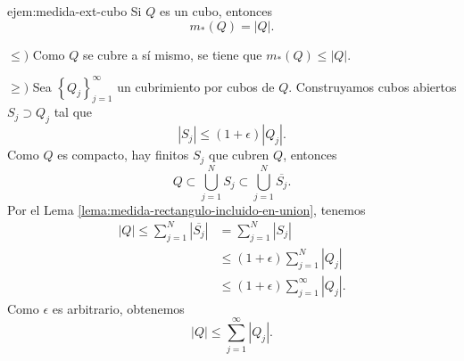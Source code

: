   \begin{ejemplo}{ejem:medida-ext-cubo}
  Si $Q$ es un cubo, entonces \[m_{*}(Q)=|Q|.\] 
  
  $\leq)$
  Como $Q$ se cubre a s\'i mismo, se tiene que $m_{*}(Q)\leq |Q|$.
  
  $\geq)$ 
  Sea $\left\{Q_j\right\}_{j=1}^{\infty}$ un cubrimiento por cubos de $Q$. Construyamos cubos abiertos $S_j \supset Q_j$ tal que 
  \[
  |S_j|\leq (1+\epsilon) |Q_j|.
  \]
  Como $Q$ es compacto, hay finitos $S_j$ que cubren $Q$, entonces
  \[
  Q\subset \bigcup\limits_{j=1}^N S_j \subset 
  \bigcup\limits_{j=1}^N \overline{S_j}.
  \]
  Por el Lema \ref{lema:medida-rectangulo-incluido-en-union}, tenemos
  \[
  \begin{split}
  |Q|\leq 
  \sum\limits_{j=1}^N |\overline{S_j}|&=
  \sum\limits_{j=1}^N |S_j|
  \\
  &\leq (1+\epsilon) \sum\limits_{j=1}^N |Q_j|\\
  &\leq   (1+\epsilon) \sum\limits_{j=1}^{\infty} |Q_j|.
  \end{split}
  \]
  Como $\epsilon$ es arbitrario, obtenemos
  \[
  |Q|\leq \sum\limits_{j=1}^{\infty} |Q_j|.
  \]
  \end{ejemplo}
  

